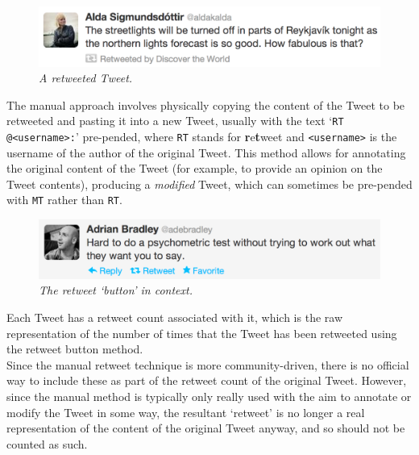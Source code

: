 \begin{figure}[h]
\centering
\includegraphics[scale=0.3]{2.Background/Media/northern_lights_tweet.png} 
\caption{\textit{A retweeted Tweet.}}
\label{fig:northern_lights_tweet}
\end{figure}

The manual approach involves physically copying the content of the Tweet to be retweeted and pasting it into a new Tweet, usually with the text `\texttt{RT @<username>:}' pre-pended, where \texttt{RT} stands for \textbf{r}e\textbf{t}weet and \texttt{<username>} is the username of the author of the original Tweet. This method allows for annotating the original content of the Tweet (for example, to provide an opinion on the Tweet contents), producing a \textit{modified} Tweet, which can sometimes be pre-pended with \texttt{MT} rather than \texttt{RT}.

\begin{figure}[h]
\centering
\includegraphics[scale=0.3]{2.Background/Media/retweet_button.png} 
\caption{\textit{The retweet `button' in context.}}
\label{fig:retweet_button}
\end{figure}

Each Tweet has a retweet count associated with it, which is the raw representation of the number of times that the Tweet has been retweeted using the retweet button method.\\
Since the manual retweet technique is more community-driven, there is no official way to include these as part of the retweet count of the original Tweet. However, since the manual method is typically only really used with the aim to annotate or modify the Tweet in some way, the resultant `retweet'  is no longer a real representation of the content of the original Tweet anyway, and so should not be counted as such.

